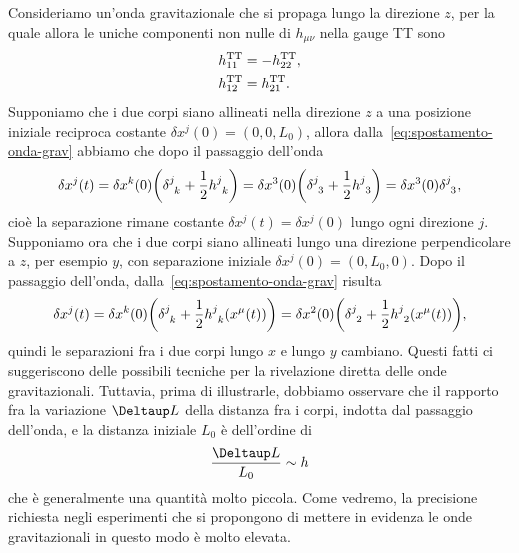 Consideriamo un'onda gravitazionale che si propaga lungo la direzione $z$, per
la quale allora le uniche componenti non nulle di $h_{\mu\nu}$ nella gauge TT
sono
\begin{subequations}
  \begin{align}
    h_{11}^{\textup{TT}} &= - h_{22}^{\textup{TT}}, \\
    h_{12}^{\textup{TT}} &= h_{21}^{\textup{TT}}.
  \end{align}
\end{subequations}
Supponiamo che i due corpi siano allineati nella direzione $z$ a una posizione
iniziale reciproca costante $\delta x^{j}(0) = (0,0,L_{0})$, allora
dalla~\eqref{eq:spostamento-onda-grav} abbiamo che dopo il passaggio dell'onda
\begin{equation}
  \delta x^{j}(t) = \delta x^{k}(0)\bigg(\tensor{\delta}{^{j}_{k}} + \frac{1}{2}
  \tensor{h}{^{j}_{k}}\bigg) = \delta x^{3}(0)\bigg(\tensor{\delta}{^{j}_{3}} +
  \frac{1}{2}\tensor{h}{^{j}_{3}}\bigg) = \delta x^{3}(0)
  \tensor{\delta}{^{j}_{3}},
\end{equation}
cioè la separazione rimane costante $\delta x^{j}(t) = \delta x^{j}(0)$ lungo
ogni direzione $j$.  Supponiamo ora che i due corpi siano allineati lungo una
direzione perpendicolare a $z$, per esempio $y$, con separazione iniziale
$\delta x^{j}(0) = (0,L_{0},0)$.  Dopo il passaggio dell'onda,
dalla~\eqref{eq:spostamento-onda-grav} risulta
\begin{equation}
  \delta x^{j}(t) = \delta x^{k}(0) \bigg(\tensor{\delta}{^{j}_{k}} +
  \frac{1}{2}\tensor{h}{^{j}_{k}}(x^{\mu}(t))\bigg) = \delta
  x^{2}(0)\bigg(\tensor{\delta}{^{j}_{2}} +
  \frac{1}{2}\tensor{h}{^{j}_{2}}(x^{\mu}(t))\bigg),
\end{equation}
quindi le separazioni fra i due corpi lungo $x$ e lungo $y$ cambiano.  Questi
fatti ci suggeriscono delle possibili tecniche per la rivelazione diretta delle
onde gravitazionali.  Tuttavia, prima di illustrarle, dobbiamo osservare che il
rapporto fra la variazione $\var L$ della distanza fra i corpi, indotta dal
passaggio dell'onda, e la distanza iniziale $L_{0}$ è dell'ordine di
\begin{equation}
  \frac{\var L}{L_{0}} \sim h
\end{equation}
che è generalmente una quantità molto piccola.  Come vedremo, la precisione
richiesta negli esperimenti che si propongono di mettere in evidenza le onde
gravitazionali in questo modo è molto elevata.


